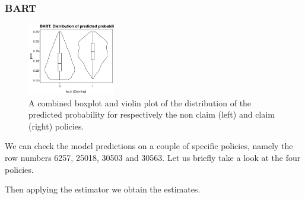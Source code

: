 \documentclass[
]{article}
\begin{document}
\hypertarget{bart-1}{%
\subsubsection{BART}\label{bart-1}}

\begin{figure}[h]
    \centering
    \includegraphics[width=0.34\textwidth]{figures/freq_p_bart_wide.png}
    \caption{A combined boxplot and violin plot of the distribution of the predicted probability for respectively the non claim (left) and claim (right) policies.}
\end{figure}

We can check the model predictions on a couple of specific policies,
namely the row numbers 6257, 25018, 30503 and 30563. Let us briefly take
a look at the four policies.

Then applying the estimator we obtain the estimates.
\end{document}
